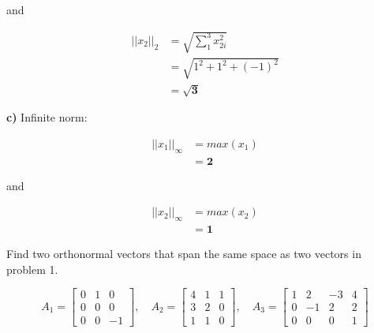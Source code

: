 \documentclass[12pt]{article}
\newenvironment{question}[2][Question]{\begin{trivlist}
\item[\hskip \labelsep {\bfseries #1}\hskip \labelsep {\bfseries #2.}]}{\end{trivlist}}
\begin{document}
\noindent and


\begin{align*}
    ||x_2||_2 &= \sqrt{\sum_{1}^{3} x_{2i}^2} \\
              &= \sqrt{1^2 + 1^2 + (- 1)^2} \\
              &= \bm{\sqrt{3}}
\end{align*}


\noindent\textbf{c)} \newline
Infinite norm:

\begin{align*}
    ||x_1||_{\infty} &= max(x_1) \\
                     &= \bm{2}
\end{align*}

\noindent and


\begin{align*}
    ||x_2||_{\infty} &= max(x_2) \\
                     &= \bm{1}
\end{align*}

\newpage
\begin{question}{2} %
Find two orthonormal vectors that span the same space as two vectors in problem 1.
\end{question}


\newpage
\begin{question}{3} %
\begin{equation}
A_1 = 
\begin{bmatrix}
     0 & 1 &  0 \\ 
     0 & 0 &  0 \\ 
     0 & 0 & -1 
\end{bmatrix}, \quad 
A_2 = 
\begin{bmatrix}
     4 & 1 & 1 \\ 
     3 & 2 & 0 \\ 
     1 & 1 & 0 
\end{bmatrix}, \quad 
A_3 =
\begin{bmatrix}
    1 &  2 & -3 & 4 \\ 
    0 & -1 &  2 & 2 \\ 
    0 &  0 &  0 & 1
\end{bmatrix}  \nonumber
\end{equation}
\end{question}



 
\end{document}
